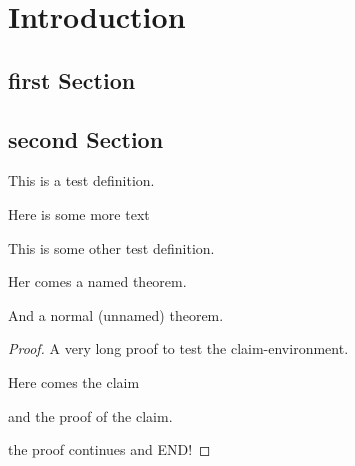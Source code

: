 

\listoftodos

\chapter{Introduction}
\label{ch:introduction}




\section{first Section}
\label{sec:erste-section}


\section{second Section}
\label{sec:zweite-section}

\blindtext 

\begin{definition}
  This is a test definition.
\end{definition}

Here is some more text

\begin{definition}
  This is some other test definition.
\end{definition}

\begin{theorem*}[thmtitel]
  Her comes a named theorem.
\end{theorem*}

\blindtext

\begin{theorem}
  And a normal (unnamed) theorem.
\end{theorem}


\begin{proof}
  A very long proof to test the claim-environment.

  \blindtext

  \begin{claim}
    Here comes the claim
  \end{claim}

  \begin{claimproof}{}
    and the proof of the claim.
  \end{claimproof}
  
  the proof continues
  \blindtext
  and END!
\end{proof}

